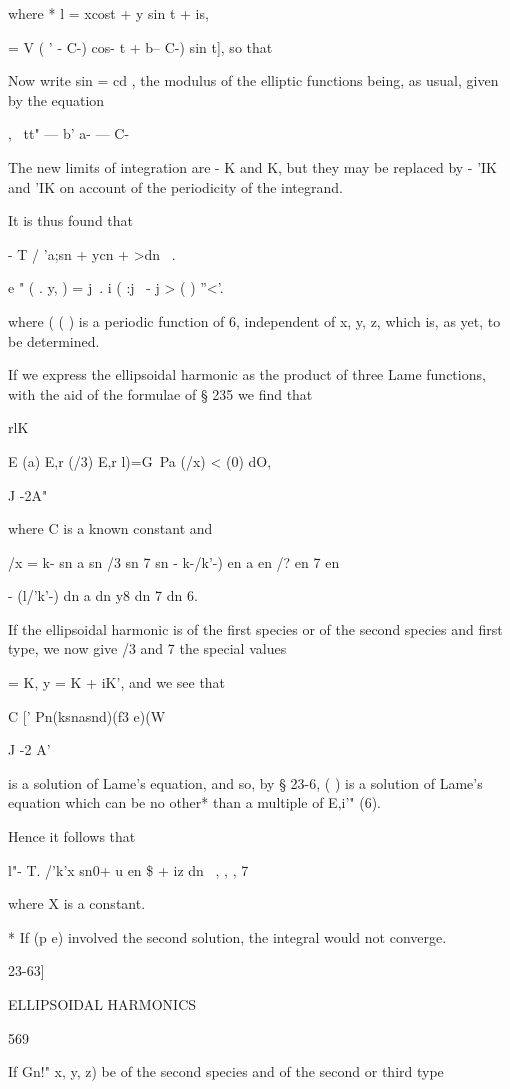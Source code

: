 {{{{{{{{where * l = xcost + y sin t + is,

  = V ( ' - C-) cos- t + b-- C-) sin t], so that

Now write sin = cd , the modulus of the elliptic functions being, as
usual, given by the equation

, \ tt" — b' a- — C-

The new limits of integration are - K and K, but they may be replaced
by - 'IK and 'IK on account of the periodicity of the integrand.

It is thus found that

 - T / 'a;sn + ycn + >dn \ .

e " ( . y, ) = j\ . i ( :j \ - j > ( ) ''<'.

where ( ( ) is a periodic function of 6, independent of x, y, z, which
is, as yet, to be determined.

If we express the ellipsoidal harmonic as the product of three Lame
functions, with the aid of the formulae of § 235 we find that

rlK

E (a) E,r (/3) E,r l)=G\ Pa (/x) < (0) dO,

J -2A"

where C is a known constant and

/x = k- sn a sn /3 sn 7 sn - k-/k'-) en a en /? en 7 en

- (l/'k'-) dn a dn y8 dn 7 dn 6.

If the ellipsoidal harmonic is of the first species or of the second
species and first type, we now give /3 and 7 the special values

  = K, y = K + iK', and we see that

C [' Pn(ksnasnd)(f3 e)(W

J -2 A'

is a solution of Lame's equation, and so, by § 23-6, ( ) is a solution
of Lame's equation which can be no other* than a multiple of E,i'"
(6).

Hence it follows that

l"- T. /'k'x sn0+ u en \$ + iz dn \ , , , 7

where X is a constant.

* If (p e) involved the second solution, the integral would not
converge.

23-63]

ELLIPSOIDAL HARMONICS

569

If Gn!" x, y, z) be of the second species and of the second or third
type

}}}}}}}}
